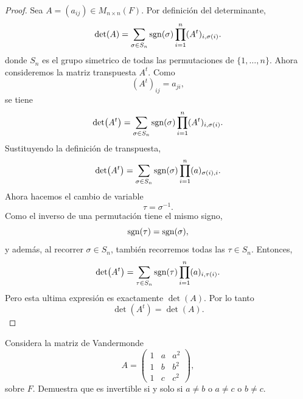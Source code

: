\documentclass[12pt,a4paper]{article}
\begin{document}
    \begin{proof}
        Sea $A=(a_{ij})\in M_{n\times n}(F)$. Por definición del determinante,
        \begin{equation*}
            \det(A)=\sum_{\sigma\in S_{n}}\operatorname{sgn}(\sigma)\prod_{i=1}^{n}(A^{t})_{i,\sigma(i)}.
        \end{equation*}
        donde $S_{n}$ es el grupo simetrico de todas las permutaciones de $\{1,\dots, n\}$.
        Ahora consideremos la matriz transpuesta $A^{t}$. Como
        \begin{equation*}
            (A^{t})_{ij}=a_{ji},
        \end{equation*}
        se tiene
        \begin{equation*}
            \det(A^{t})=\sum_{\sigma\in S_{n}}\operatorname{sgn}(\sigma)\prod_{i=1}^{n}(A^{t})_{i,\sigma(i)}.
        \end{equation*}
        Sustituyendo la definición de transpuesta,
        \begin{equation*}
            \det(A^{t})=\sum_{\sigma\in S_{n}}\operatorname{sgn}(\sigma)\prod_{i=1}^{n}(a)_{\sigma(i),i}.
        \end{equation*}
        Ahora hacemos el cambio de variable
        \begin{equation*}
            \tau=\sigma^{-1}.
        \end{equation*}
        Como el inverso de una permutación tiene el mismo signo,
        \begin{equation*}
            \operatorname{sgn}(\tau)=\operatorname{sgn}(\sigma),
        \end{equation*}
        y además, al recorrer $\sigma\in S_{n}$, también recorremos todas las $\tau\in S_{n}$.
        Entonces,
        \begin{equation*}
            \det(A^{t})=\sum_{\tau\in S_{n}}\operatorname{sgn}(\tau)\prod_{i=1}^{n}(a)_{i,\tau(i)}.
        \end{equation*}
        Pero esta ultima expresión es exactamente $\det(A)$. Por lo tanto
        \begin{equation*}
            \det(A^{t})=\det(A).
        \end{equation*}
    \end{proof}

    \begin{mdframed}[style=mdpinkbox,frametitle={Ejercicio 4}]
        Considera la matriz de Vandermonde
        \begin{equation*}
            A=
            \begin{pmatrix}
                1 & a & a^{2}\\
                1 & b & b^{2}\\
                1 & c & c^{2}
            \end{pmatrix},
        \end{equation*}
        sobre $F$. Demuestra que es invertible si y solo si $a\neq b$ o $a\neq c$ o $b\neq c$.
    \end{mdframed}
\end{document}
